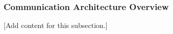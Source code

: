 
\subsubsection{Communication Architecture Overview}
\label{subsubsec:design_5_1_communication_architecture_overview}

[Add content for this subsection.]
